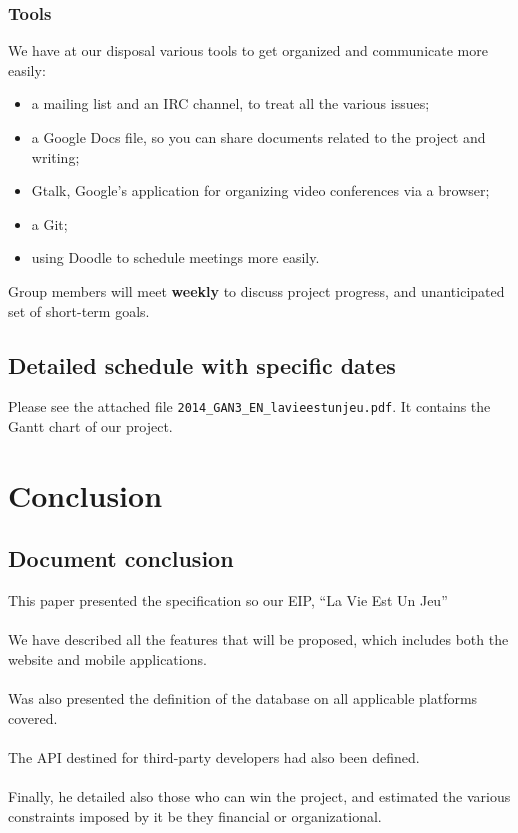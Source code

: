 \documentclass {life-en}
\begin{document}
\subsection{Tools}

We have at our disposal various tools to get organized and communicate more easily: \\

\begin{itemize}
  \item a mailing list and an IRC channel, to treat all the various issues;
  \item a Google Docs file, so you can share documents related to the project and writing;
  \item Gtalk, Google's application for organizing video conferences via a browser;
  \item a Git;
  \item using Doodle to schedule meetings more easily.
\end{itemize}

Group members will meet \textbf{weekly} to discuss project progress, and unanticipated set of short-term goals.


\section{Detailed schedule with specific dates}

Please see the attached file \texttt{2014\_GAN3\_EN\_lavieestunjeu.pdf}. It contains the Gantt chart of our project.


\chapter{Conclusion}

\section{Document conclusion}

This paper presented the specification so our EIP, ``La Vie Est Un Jeu'' \\
\\
We have described all the features that will be proposed, which includes both the website and mobile applications.\\
\\
Was also presented the definition of the database on all applicable platforms covered.\\
\\
The API destined for third-party developers had also been defined.\\
\\
Finally, he detailed also those who can win the project, and estimated the various constraints imposed by it be they financial or organizational.\\
\end{document}
